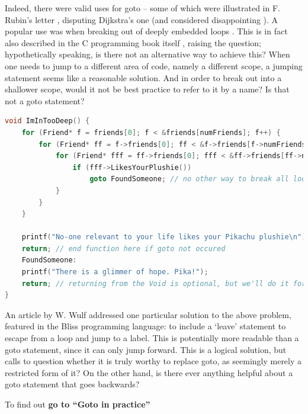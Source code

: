 \documentclass{journal}
\begin{document}
Indeed, there were valid uses for goto -- some of which were illustrated in F. Rubin's letter \cite{gotoodeep}, disputing Dijkstra's one (and considered disappointing \cite{disappointing}). A popular use was when breaking out of deeply embedded loops \cite{gotoodeep}. This is in fact also described in the C programming book itself \cite{cprogramming}, raising the question; hypothetically speaking, is there not an alternative way to achieve this? When one needs to jump to a different area of code, namely a different scope, a jumping statement seems like a reasonable solution. And in order to break out into a shallower scope, would it not be best practice to refer to it by a name? Is that not a goto statement?
\newpage
\begin{lstlisting}[language=C,caption={An example of goto used for breaking loops (C)}]
void ImInTooDeep() {
	for (Friend* f = friends[0]; f < &friends[numFriends]; f++) {
		for (Friend* ff = f->friends[0]; ff < &f->friends[f->numFriends]; ff++) {
			for (Friend* fff = ff->friends[0]; fff < &ff->friends[ff->numFriends]; ff++) {
				if (fff->LikesYourPlushie())
					goto FoundSomeone; // no other way to break all loops at once
			}
		}
	}

	printf("No-one relevant to your life likes your Pikachu plushie\n");
	return; // end function here if goto not occured
	FoundSomeone:
	printf("There is a glimmer of hope. Pika!");
	return; // returning from the Void is optional, but we'll do it for health and safety
}
\end{lstlisting}

An article by W. Wulf \cite{againstgoto} addressed one particular solution to the above problem, featured in the Bliss programming language: to include a `leave' statement to escape from a loop and jump to a label. This is potentially more readable than a goto statement, since it can only jump forward. This is a logical solution, but calls to question whether it is truly worthy to replace goto, as seemingly merely a restricted form of it? On the other hand, is there ever anything helpful about a goto statement that goes backwards?

To find out \textbf{go to ``Goto in practice''}
\newpage
\setcounter{section}{0}
\end{document}
